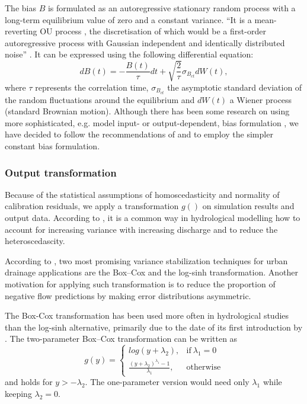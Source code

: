 \documentclass{ctuthesis}\usepackage[]{graphicx}\usepackage[]{color}
\begin{document}
The bias $B$ is formulated as an autoregressive stationary random process with a long-term equilibrium value of zero and a constant variance. \enquote{It is a mean-reverting OU process \citep{uhlenbeck1930theory}, the discretisation of which would be a first-order autoregressive process with Gaussian independent and identically distributed noise} \citep{giudice2013improving}. It can be expressed using the following differential equation:
\begin{equation} 
dB (t)= - \frac{B (t)}{\tau}dt + \sqrt{\frac{2}{\tau}} \sigma_{B_{ct}}  dW(t),
\end{equation}
where $\tau$ represents the correlation time, $\sigma_{B_{ct}}$ the asymptotic standard deviation of the random fluctuations around the equilibrium and $dW(t)$ a Wiener process (standard Brownian motion). Although there has been some research on using more sophisticated, e.g. model input- or output-dependent, bias formulation \citep{honti2013integrated}, we have decided to follow the recommendations of \cite{giudice2013improving} and to employ the simpler constant bias formulation.



\subsubsection{Output transformation} \label{transfTheor}

Because of the  statistical assumptions of homoscedasticity and normality of calibration residuals, we apply a transformation $g()$ on simulation results and output data.  According to  \cite{giudice2013improving}, it is a common way in hydrological modelling how to account for increasing variance with increasing discharge and to reduce the heteroscedascity.

According to \cite{giudice2013improving},  two most promising variance stabilization techniques for urban drainage
applications are the Box–Cox \citep{box1964analysis}  and the log-sinh \citep{wang2012log} transformation. Another motivation for applying such transformation is to reduce the proportion of negative flow predictions by making error distributions asymmetric.

The Box-Cox transformation has been used more often in hydrological studies \\ \citep{giudice2013improving} than the log-sinh alternative, primarily due to the date of its first introduction by \cite{box1964analysis}. The two-parameter Box–Cox transformation can be written as
\begin{equation}
 g(y)=
    \begin{cases}
      log(y+\lambda_2) , & \text{if}\ \lambda_1=0 \\
      \frac{(y+\lambda_2)^{\lambda_1}-1}{\lambda_1} , & \text{otherwise}
    \end{cases}
\end{equation}
and holds for $y > -\lambda_2$. The one-parameter version would need only  $\lambda_1$  while keeping $\lambda_2 = 0$.
\end{document}
